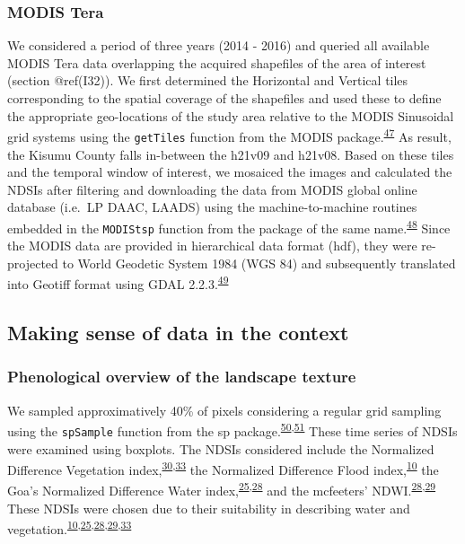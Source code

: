 \documentclass[12pt,oneside]{article}
\begin{document}
\hypertarget{I33}{%
\subsubsection{MODIS Tera}\label{I33}}

We considered a period of three years (2014 - 2016) and queried all available MODIS Tera data overlapping the acquired shapefiles of the area of interest (section @ref(I32)). We first determined the Horizontal and Vertical tiles corresponding to the spatial coverage of the shapefiles and used these to define the appropriate geo-locations of the study area relative to the MODIS Sinusoidal grid systems using the \texttt{getTiles} function from the MODIS package.\textsuperscript{\protect\hyperlink{ref-Mattiuzzi_and_Detsch_2018}{47}} As result, the Kisumu County falls in-between the h21v09 and h21v08. Based on these tiles and the temporal window of interest, we mosaiced the images and calculated the NDSIs after filtering and downloading the data from MODIS global online database (i.e.~LP DAAC, LAADS) using the machine-to-machine routines embedded in the \texttt{MODIStsp} function from the package of the same name.\textsuperscript{\protect\hyperlink{ref-Busetto_and_ranghetti_2016}{48}} Since the MODIS data are provided in hierarchical data format (hdf), they were re-projected to World Geodetic System 1984 (WGS 84) and subsequently translated into Geotiff format using GDAL 2.2.3.\textsuperscript{\protect\hyperlink{ref-GDAL_OGRcontributors_2018}{49}}

\hypertarget{I4}{%
\subsection{Making sense of data in the context}\label{I4}}

\hypertarget{I41}{%
\subsubsection{Phenological overview of the landscape texture}\label{I41}}

We sampled approximatively 40\% of pixels considering a regular grid sampling using the \texttt{spSample} function from the sp package.\textsuperscript{\protect\hyperlink{ref-Bivand_et_al_2013}{50},\protect\hyperlink{ref-Pebesma_Bivand_2005}{51}} These time series of NDSIs were examined using boxplots. The NDSIs considered include the Normalized Difference Vegetation index,\textsuperscript{\protect\hyperlink{ref-Rouse_et_al_1973}{30},\protect\hyperlink{ref-Tucker_1979}{33}} the Normalized Difference Flood index,\textsuperscript{\protect\hyperlink{ref-Boschetti_et_al_2014}{10}} the Goa's Normalized Difference Water index,\textsuperscript{\protect\hyperlink{ref-Gao_1996}{25},\protect\hyperlink{ref-Ji_et_al_2009}{28}} and the mcfeeters' NDWI.\textsuperscript{\protect\hyperlink{ref-Ji_et_al_2009}{28},\protect\hyperlink{ref-McFeeters_1996}{29}} These NDSIs were chosen due to their suitability in describing water and vegetation.\textsuperscript{\protect\hyperlink{ref-Boschetti_et_al_2014}{10},\protect\hyperlink{ref-Gao_1996}{25},\protect\hyperlink{ref-Ji_et_al_2009}{28},\protect\hyperlink{ref-McFeeters_1996}{29},\protect\hyperlink{ref-Tucker_1979}{33}}
\end{document}
